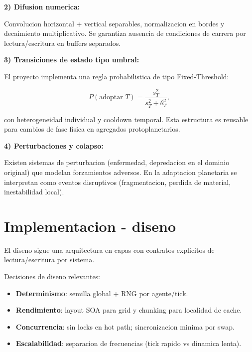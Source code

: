 \documentclass[11pt]{article}
\begin{document}
\textbf{2) Difusion numerica:}

Convolucion horizontal + vertical separables, normalizacion en bordes y decaimiento multiplicativo. Se garantiza ausencia de condiciones de carrera por lectura/escritura en buffers separados.

\textbf{3) Transiciones de estado tipo umbral:}

El proyecto implementa una regla probabilistica de tipo Fixed-Threshold:

\[
P(\text{adoptar }T)=\frac{s_T^2}{s_T^2+\theta_T^2},
\]

con heterogeneidad individual y cooldown temporal. Esta estructura es reusable para cambios de fase fisica en agregados protoplanetarios.

\textbf{4) Perturbaciones y colapso:}

Existen sistemas de perturbacion (enfermedad, depredacion en el dominio original) que modelan forzamientos adversos. En la adaptacion planetaria se interpretan como eventos disruptivos (fragmentacion, perdida de material, inestabilidad local).

\section*{Implementacion - diseno}

El diseno sigue una arquitectura en capas con contratos explicitos de lectura/escritura por sistema.

\begin{center}
\end{center}

Decisiones de diseno relevantes:

\begin{itemize}
  \item \textbf{Determinismo}: semilla global + RNG por agente/tick.
  \item \textbf{Rendimiento}: layout SOA para grid y chunking para localidad de cache.
  \item \textbf{Concurrencia}: sin locks en hot path; sincronizacion minima por swap.
  \item \textbf{Escalabilidad}: separacion de frecuencias (tick rapido vs dinamica lenta).
\end{itemize}
\end{document}
